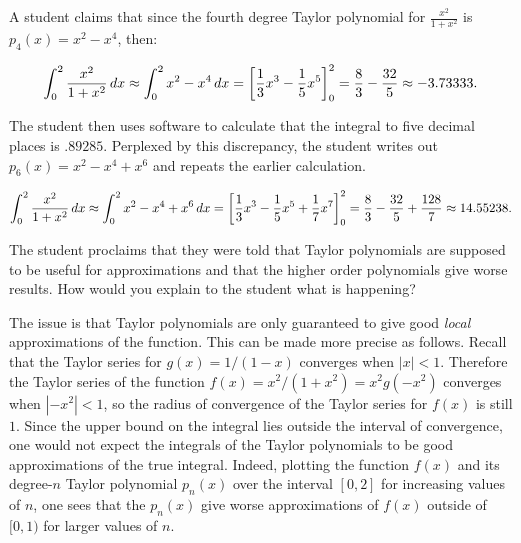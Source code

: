 \documentclass[noauthor,handout]{ximera}
\begin{document}
\begin{problem} 
A student claims that since the fourth degree Taylor polynomial for $\frac{x^2}{1+x^2}$ is $p_4(x) = x^2-x^4$, then:

\[\int_0^2 \frac{x^2}{1+x^2} \mathop{}\!d x \approx \int_0^2 x^2-x^4 \mathop{}\!d x = \bigg[ \frac{1}{3}x^3-\frac{1}{5}x^5 \bigg]_0^2 = \frac{8}{3}-\frac{32}{5} \approx -3.73333.\]

The student then uses software to calculate that the integral to five decimal places is $.89285$.  Perplexed by this discrepancy, the student writes out $p_6(x) = x^2-x^4+x^6$  and repeats the earlier calculation.

\[\int_0^2 \frac{x^2}{1+x^2} \mathop{}\!d x \approx \int_0^2 x^2-x^4+x^6 \mathop{}\!d x = \bigg[ \frac{1}{3}x^3-\frac{1}{5}x^5+\frac{1}{7}x^7 \bigg]_0^2 = \frac{8}{3}-\frac{32}{5} +\frac{128}{7} \approx 14.55238.\]

The student proclaims that they were told that Taylor polynomials are supposed to be useful for approximations and that the higher order polynomials give worse results.  How would you explain to the student what is happening?

\begin{freeResponse}
The issue is that Taylor polynomials are only guaranteed to give good \emph{local} approximations of the function. This can be made more precise as follows. Recall that the Taylor series for $g(x)=1/(1-x)$ converges when $|x|<1$. Therefore the Taylor series of the function $f(x)=x^2/(1+x^2) = x^2 g(-x^2)$ converges when $|-x^2| <1$, so the radius of convergence of the Taylor series for $f(x)$ is still $1$. Since the upper bound on the integral lies outside the interval of convergence, one would not expect the integrals of the Taylor polynomials to be good approximations of the true integral. Indeed, plotting the function $f(x)$ and its degree-$n$ Taylor polynomial $p_n(x)$ over the interval $[0,2]$ for increasing values of $n$, one sees that the $p_n(x)$ give worse approximations of $f(x)$ outside of $[0,1)$ for larger values of $n$.
\end{freeResponse}
\end{problem}
\end{document}
